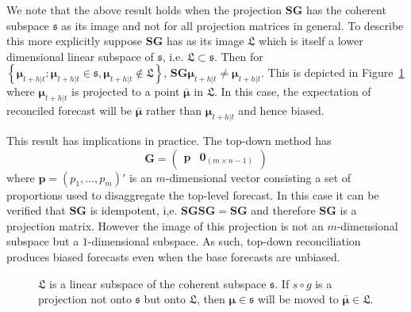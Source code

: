 \documentclass[12pt]{article}
\theoremstyle{definition}
\theoremstyle{property}
\begin{document}
	We note that the above result holds when the projection $\bm{SG}$ has the coherent subspace $\mathfrak{s}$ as its image and not for all projection matrices in general. To describe this more explicitly suppose $\bm{SG}$ has as its image  $\mathfrak{L}$ which is itself a lower dimensional linear subspace of $\mathfrak{s}$, i.e. $\mathfrak{L}\subset\mathfrak{s}$. Then for $\left\{\bm{\mu}_{t+h|t}:\bm{\mu}_{t+h|t}\in\mathfrak{s},\bm{\mu}_{t+h|t}\notin\mathfrak{L}\right\}$,  $\bm{S}\bm{G}\bm{\mu}_{t+h|t} \ne \bm{\mu}_{t+h|t}$. This is depicted in Figure~\ref{fig:Schematic_3D} where $\bm{\mu}_{t+h|t}$ is projected to a point $\bar{\bm{\mu}}$ in $\mathfrak{L}$.  In this case, the expectation of reconciled forecast will be $\bar{\bm{\mu}}$ rather than $\bm{\mu}_{t+h|t}$ and hence biased.  
	
	This result has implications in practice. The top-down method \citep{Gross1990} has 
	\begin{equation}\label{eq:top-downG}
	\bm{G}=\begin{pmatrix}
	\bm{p} & \bm{0}_{(m \times n-1)}
	\end{pmatrix}
	\end{equation}
    where $\bm{p} = (p_1,\dots,p_m)'$ is an $m$-dimensional vector consisting a set of proportions used to disaggregate the top-level forecast.  In this case it can be verified that $\bm{SG}$ is idempotent, i,e. $\bm{SGSG}=\bm{SG}$ and therefore $\bm{SG}$ is a projection matrix.  However the image of this projection is not an $m$-dimensional subspace but a $1$-dimensional subspace.  As such, top-down reconciliation produces biased forecasts even when the base forecasts are unbiased.
		
	\begin{figure}[H]
		\centering
		\vspace{-0.9cm}
		\small
		\resizebox{\linewidth}{!}{
			
		}
		\caption{$\mathfrak{L}$ is a linear subspace of the coherent subspace $\mathfrak{s}$. If $s\circ g$ is a projection not onto $\mathfrak{s}$ but onto $\mathfrak{L}$, then $\bm{\mu} \in \mathfrak{s}$ will be moved to $\bar{\bm{\mu}} \in \mathfrak{L}$.}\label{fig:Schematic_3D}
	\end{figure}
	
\end{document}
